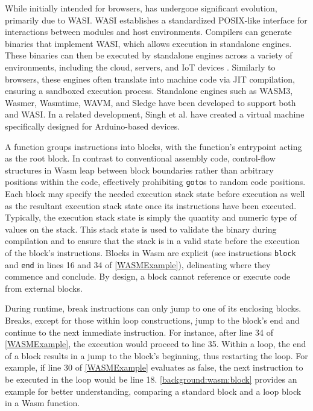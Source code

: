 While initially intended for browsers, \Wasm has undergone significant evolution, primarily due to WASI\cite{WASI}.
WASI establishes a standardized POSIX-like interface for interactions between \Wasm modules and host environments.
Compilers can generate \Wasm binaries that implement WASI, which allows execution in standalone engines.
These binaries can then be executed by standalone engines across a variety of environments, including the cloud, servers, and IoT devices \cite{makitalo2021webassembly}.
Similarly to browsers, these engines often translate \Wasm into machine code via JIT compilation, ensuring a sandboxed execution process.
Standalone engines such as WASM3, Wasmer, Wasmtime, WAVM, and Sledge\cite{Sledge} have been developed to support both \Wasm and WASI.
In a related development, Singh et al.\cite{WARDuino2019} have created a \Wasm virtual machine specifically designed for Arduino-based devices.


\label{wasm:control_flow}

A \Wasm function groups instructions into blocks, with the function's entrypoint acting as the root block. 
In contrast to conventional assembly code, control-flow structures in Wasm leap between block boundaries rather than arbitrary positions within the code, effectively prohibiting \texttt{goto}s to random code positions. 
Each block may specify the needed execution stack state before execution as well as the resultant execution stack state once its instructions have been executed.
Typically, the execution stack state is simply the quantity and numeric type of values on the stack. 
This stack state is used to validate the binary during compilation and to ensure that the stack is in a valid state before the execution of the block's instructions.
Blocks in Wasm are explicit (see instructions \texttt{block} and \texttt{end} in lines 16 and 34 of \autoref{WASMExample}), delineating where they commence and conclude.
By design, a block cannot reference or execute code from external blocks.


During runtime, \Wasm break instructions can only jump to one of its enclosing blocks. 
Breaks, except for those within loop constructions, jump to the block's end and continue to the next immediate instruction. 
For instance, after line 34 of \autoref{WASMExample}, the execution would proceed to line 35. 
Within a loop, the end of a block results in a jump to the block's beginning, thus restarting the loop. 
For example, if line 30 of \autoref{WASMExample} evaluates as false, the next instruction to be executed in the loop would be line 18. 
\autoref{background:wasm:block} provides an example for better understanding, comparing a standard block and a loop block in a Wasm function.


